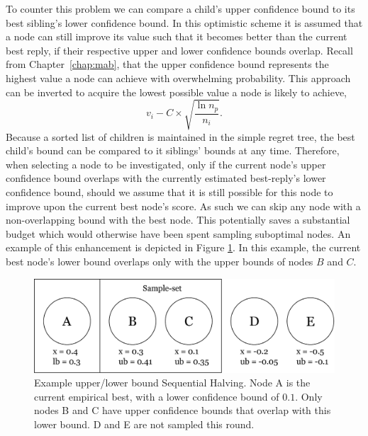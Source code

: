 \documentclass{kecsmstr}
\begin{document}
To counter this problem we can compare a child's upper confidence bound to its best sibling's lower confidence bound. In this optimistic scheme it is assumed that a node can still improve its value such that it becomes better than the current best reply, if their respective upper and lower confidence bounds overlap. Recall from Chapter~\ref{chap:mab}, that the upper confidence bound represents the highest value a node can achieve with overwhelming probability. This approach can be inverted to acquire the lowest possible value a node is likely to achieve,
\begin{equation}
  	v_i - C \times \displaystyle\sqrt{\frac{\ln{n_p}}{n_i}}.
\end{equation}
Because a sorted list of children is maintained in the simple regret tree, the best child's bound can be compared to it siblings' bounds at any time. Therefore, when selecting a node to be investigated, only if the current node's upper confidence bound overlaps with the currently estimated best-reply's lower confidence bound, should we assume that it is still possible for this node to improve upon the current best node's score. As such we can skip any node with a non-overlapping bound with the best node. This potentially saves a substantial budget which would otherwise have been spent sampling suboptimal nodes. An example of this enhancement is depicted in Figure \ref{fig:ublb}. In this example, the current best node's lower bound overlaps only with the upper bounds of nodes $B$ and $C$.

\begin{figure}[b]
	\centering
	\includegraphics[width=.55\textwidth]{img/ublb.png}
	\caption[Upper/Lower Bound enhancement example]{Example upper/lower bound Sequential Halving. Node A is the current empirical best, with a lower confidence bound of $0.1$. Only nodes B and C have upper confidence bounds that overlap with this lower bound. D and E are not sampled this round.}
	\label{fig:ublb}
\end{figure}
\end{document}
